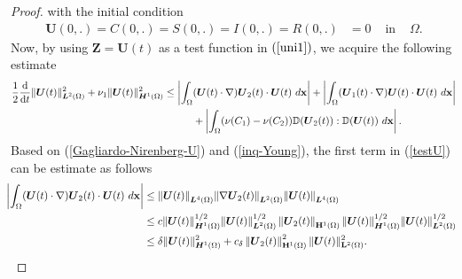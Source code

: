 \documentclass[10pt,number,preprint,times]{elsarticle}
\numberwithin{equation}{section} %
\begin{document}
\begin{proof}
		with the initial condition
		$$\begin{aligned}
			\boldsymbol{U}(0,\mathbf{.})=C(0,\mathbf{.})=S(0,\mathbf{.})=I(0,\mathbf{.})=R(0,\mathbf{.})&=0& \text{ in } & \Omega.
			\end{aligned}
		$$
		Now, by using $\boldsymbol{Z} = \boldsymbol{U}(t)$ as a test function in $(\ref{uni1})$, we acquire the following estimate
		\begin{equation}\label{testU}
			\begin{aligned}
				\frac{1}{2} \frac{\mathrm{d}}{\mathrm{d} t}\|\boldsymbol{U}(t)\|_{\boldsymbol{L}^2(\Omega)}^{2}+\nu_{1}\|\boldsymbol{U}(t)\|_{\boldsymbol{H}^1(\Omega)}^{2} & \leq \left|\int_{\Omega}( \boldsymbol{U}(t)\cdot \nabla) \boldsymbol{U}_{2}(t)\cdot \boldsymbol{U}(t)~d{\mathbf{x}}\right|+\left|\int_{\Omega}( \boldsymbol{U}_1(t)\cdot \nabla) \boldsymbol{U}(t)\cdot \boldsymbol{U}(t)~d{\mathbf{x}}\right|
				\\
				& \hspace{1  cm}
				+\left|\int_{\Omega}(\nu(C_1)-\nu(C_{2})) \mathbb{D}(\boldsymbol{U}_{2}(t)): \mathbb{D}(\boldsymbol{U}(t))~d{\mathbf{x}}\right|.
			\end{aligned} 
		\end{equation}
		Based on (\ref{Gagliardo-Nirenberg-U}) and (\ref{inq-Young}), the first term in (\ref{testU}) can be estimate as follows
		\begin{equation}\label{estem-b}
			\begin{split} 
				\hspace*{-0.2cm}
				\left|\int_{\Omega}( \boldsymbol{U}(t)\cdot \nabla) \boldsymbol{U}_{2}(t)\cdot \boldsymbol{U}(t)~d{\mathbf{x}}\right| 
				&\leq {\|\boldsymbol{U}(t)\|}_{\boldsymbol{L}^4(\Omega)} {\|\nabla\boldsymbol{U}_2(t)\|}_{\boldsymbol{L}^2(\Omega)} {\|\boldsymbol{U}(t)\|}_{\boldsymbol{L}^4(\Omega)}
				\\
				&\leq c{\|\boldsymbol{U}(t)\|}_{\boldsymbol{H}^1(\Omega)}^{1/2}
				{\|\boldsymbol{U}(t)\|}_{\boldsymbol{L}^2(\Omega)}^{1/2} \left\|\boldsymbol{U}_{2}(t)\right\|_{\mathbf{H}^1(\Omega)}{\|\boldsymbol{U}(t)\|}_{\boldsymbol{H}^1(\Omega)}^{1/2}
				{\|\boldsymbol{U}(t)\|}_{\boldsymbol{L}^2(\Omega)}^{1/2}
				\\
				&\leq \delta\|\boldsymbol{U}(t)\|_{\boldsymbol{H}^1(\Omega)}^{2}+c_{\delta}\left\|\boldsymbol{U}_{2}(t)\right\|_{\mathbf{H}^{1}(\Omega)}^2\|\boldsymbol{U}(t)\|_{\mathbf{L}^{2}(\Omega)}^{2}.
			\end{split}
		\end{equation}

\end{proof}
\end{document}
